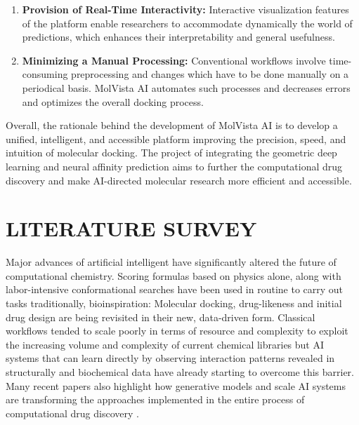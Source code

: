 \documentclass[12pt,a4]{report}
\begin{document}
\begin{enumerate}
    \item \textbf{Provision of Real-Time Interactivity:} Interactive visualization features of the platform enable researchers to accommodate dynamically the world of predictions, which enhances their interpretability and general usefulness.\\

    \item \textbf{Minimizing a Manual Processing:} Conventional workflows involve time-consuming preprocessing and changes which have to be done manually on a periodical basis. MolVista AI automates such processes and decreases errors and optimizes the overall docking process.\\

    
\end{enumerate}

\hspace{0.3in}Overall, the rationale behind the development of MolVista AI is to develop a unified, intelligent, and accessible platform improving the precision, speed, and intuition of molecular docking. The project of integrating the geometric deep learning and neural affinity prediction aims to further the computational drug discovery and make AI-directed molecular research more efficient and accessible.

\chapter{LITERATURE SURVEY}
\hspace{0.3in}Major advances of artificial intelligent have significantly altered the future of computational chemistry. Scoring formulas based on physics alone, along with labor-intensive conformational searches have been used in routine to carry out tasks traditionally, bioinspiration: Molecular docking, drug-likeness and initial drug design are being revisited in their new, data-driven form. Classical workflows tended to scale poorly in terms of resource and complexity to exploit the increasing volume and complexity of current chemical libraries but AI systems that can learn directly by observing interaction patterns revealed in structurally and biochemical data have already starting to overcome this barrier. Many recent papers also highlight how generative models and scale AI systems are transforming the approaches implemented in the entire process of computational drug discovery \cite{potineni2025generative, das2025precision}.\\
\end{document}

